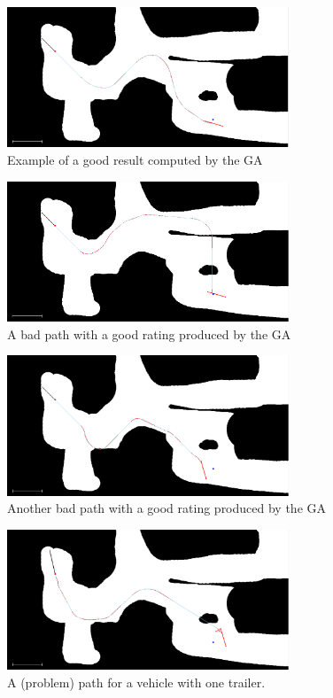 \begin{figure}[h]
\centering
\includegraphics[width=0.75\textwidth]{./Chapters/Figures/example_good_path.png}
\caption{Example of a good result computed by the GA\label{pic:example_good_path}}
\end{figure}

\begin{figure}[h]
\centering
\includegraphics[width=0.75\textwidth]{./Chapters/Figures/example_problem_path.png}
\caption{A bad path with a good rating produced by the GA\label{pic:example_problem_path}}
\end{figure}

\begin{figure}[b]
\centering
\includegraphics[width=0.75\textwidth]{./Chapters/Figures/example_problem_path2.png}
\caption{Another bad path with a good rating produced by the GA\label{pic:example_problem_path2}}
\end{figure}

\begin{figure}[b]
\centering
\includegraphics[width=0.75\textwidth]{./Chapters/Figures/example_good_path_trailer.png}
\caption{A (problem) path for a vehicle with one trailer.\label{pic:example_good_path_trailer}}
\end{figure}

